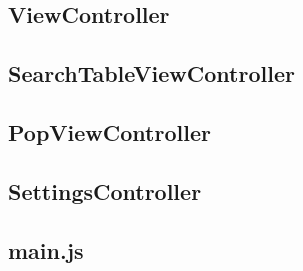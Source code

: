 \subsection{ViewController}
\subsection{SearchTableViewController}
\subsection{PopViewController}
\subsection{SettingsController}
\subsection{main.js}

